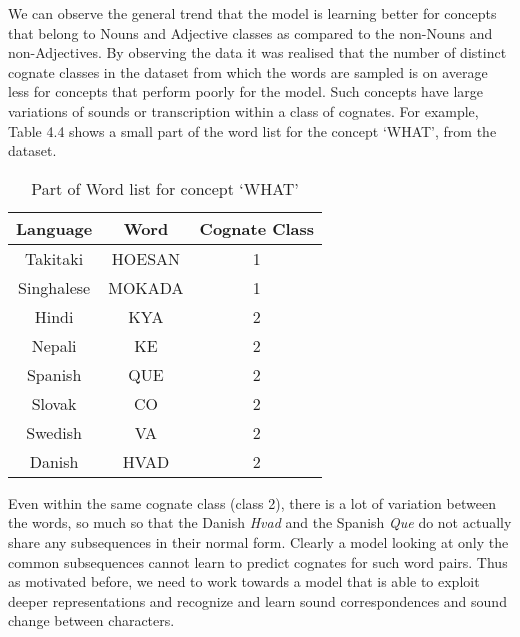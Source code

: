We can observe the general trend that the model is learning better for concepts that belong to Nouns and Adjective classes as compared to the non-Nouns and non-Adjectives. By observing the data it was realised that the number of distinct cognate classes in the dataset from which the words are sampled is on average less for concepts that perform poorly for the model. Such concepts have large variations of sounds or transcription within a class of cognates. For example, Table 4.4 shows a small part of the word list for the concept `WHAT', from the dataset.

\begin{table}[h!]
\centering
\label{my-label}
\begin{tabular}{|c|c|c|}
\hline
\textbf{Language} & \textbf{Word} & \textbf{Cognate Class} \\ \hline
Takitaki          & HOESAN        & 1                      \\ \hline
Singhalese        & MOKADA        & 1                      \\ \hline
Hindi             & KYA           & 2                      \\ \hline
Nepali            & KE            & 2                      \\ \hline
Spanish           & QUE           & 2                      \\ \hline
Slovak            & CO            & 2                      \\ \hline
Swedish           & VA            & 2                      \\ \hline
Danish            & HVAD          & 2                      \\ \hline
\end{tabular}
\caption{Part of Word list for concept `WHAT'}
\end{table}

Even within the same cognate class (class 2), there is a lot of variation between the words, so much so that the Danish \textit{Hvad} and the Spanish \textit{Que} do not actually share any subsequences in their normal form. Clearly a model looking at only the common subsequences cannot learn to predict cognates for such word pairs. Thus as motivated before, we need to work towards a model that is able to exploit deeper representations and recognize and learn sound correspondences and sound change between characters. 


